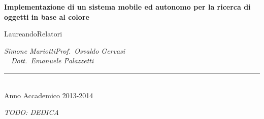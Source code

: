 \documentclass[a4paper,12pt]{report}
\def\titolotesi{Implementazione di un sistema mobile ed autonomo per la ricerca di oggetti in base al colore} %
\def\laureando{Simone Mariotti}       %
\def\annoaccademico{2013-2014}    %
\def\dedica{TODO: DEDICA}      %
\newlength\corpo
\begin{document}
\begin{titlepage}
\begin{center}
{\large \bf \titolotesi \par}

\bigskip\bigskip

\end{center}\par

\hspace{0.5cm}Laureando\hspace{7.3cm}Relatori\par

\hspace{0.0cm}\emph{\laureando}\hfill\emph{Prof.~Osvaldo Gervasi}\\
\ \ \hspace*{3.0cm}\hfill\emph{Dott.~Emanuele Palazzetti}\\

\begin{center}

\rule{40mm}{0.01mm}\\

Anno Accademico \annoaccademico

\end{center}

\end{titlepage}
\newpage
\vspace*{2.5cm}
\begin{flushright}
\begin{Large}\emph{\dedica}\end{Large}
\end{flushright}
\frenchspacing
%
\tableofcontents
{}
\listoffigures
{}
\pagestyle{fancy}
\fancyfoot[LE,RO]{\thepage \hfil}

\end{document}
